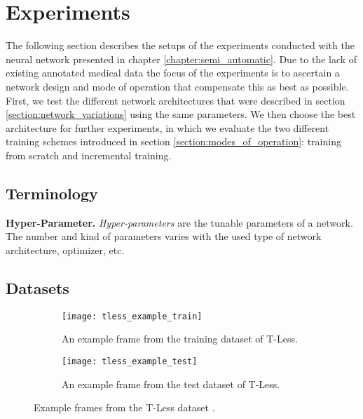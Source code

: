 
\chapter{Experiments} \label{chapter:experiments}

The following section describes the setups of the experiments conducted with the neural network presented in chapter \ref{chapter:semi_automatic}. Due to the lack of existing annotated medical data the focus of the experiments is to ascertain a network design and mode of operation that compensate this as best as possible. First, we test the different network architectures that were described in section \ref{section:network_variations} using the same parameters. We then choose the best architecture for further experiments, in which we evaluate the two different training schemes introduced in section \ref{section:modes_of_operation}: training from scratch and incremental training.

\section{Terminology}

\noindent\textbf{Hyper-Parameter.} \textit{Hyper-parameters} are the tunable parameters of a network. The number and kind of parameters varies with the used type of network architecture, optimizer, etc.

\section{Datasets}

\begin{figure}[!tbp]
	\centering
	\begin{subfigure}[t]{0.47\textwidth}
		\centering
    	\texttt{[image: tless\_example\_train]}
    	\caption{An example frame from the training dataset of T-Less.}
    	\label{fig:tless_example_train}
	\end{subfigure}
	\hfill
	\begin{subfigure}[t]{0.47\textwidth}
		\centering
    	\texttt{[image: tless\_example\_test]}
    	\caption{An example frame from the test dataset of T-Less.}
    	\label{fig:tless_example_test}
	\end{subfigure}
	\caption{Example frames from the T-Less dataset \cite{tless}.}
	\label{fig:tless_examples}
\end{figure}

